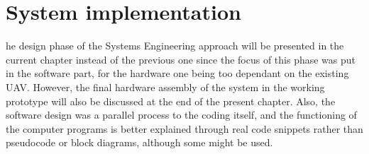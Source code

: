 
\let\textcircled=\pgftextcircled
\chapter{System implementation}

he design phase of the Systems Engineering approach will be presented in the current chapter instead of the previous one since the focus of this phase was put in the software part, for the hardware one being too dependant on the existing UAV.
However, the final hardware assembly of the system in the working prototype will also be discussed at the end of the present chapter.
Also, the software design was a parallel process to the coding itself, and the functioning of the computer programs is better explained through real code snippets rather than pseudocode or block diagrams, although some might be used.




